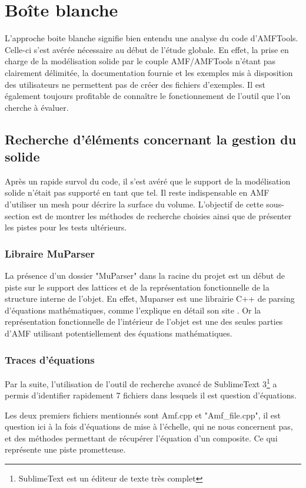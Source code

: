 \documentclass{tnreport}
\begin{document}
\section{Boîte blanche}
L'approche boite blanche signifie bien entendu une analyse du code d'AMFTools. Celle-ci s'est avérée nécessaire au début de l'étude globale. En effet, la prise en charge de la modélisation solide par le couple AMF/AMFTools n'étant pas clairement délimitée, la documentation fournie et les exemples mis à disposition des utilisateurs ne permettent pas de créer des fichiers d'exemples. Il est également toujours profitable de connaître le fonctionnement de l'outil que l'on cherche à évaluer.  
\subsection{Recherche d'éléments concernant la gestion du solide}
\label{subsec:elementsolides}
Après un rapide survol du code, il s'est avéré que le support de la modélisation solide n'était pas supporté en tant que tel. Il reste indispensable en AMF d'utiliser un mesh pour décrire la surface du volume. L'objectif de cette sous-section est de montrer les méthodes de recherche choisies ainsi que de présenter les pistes pour les tests ultérieurs. 
\subsubsection{Libraire MuParser}

La présence d'un dossier "MuParser" dans la racine du projet est un début de piste sur le support des lattices et de la représentation fonctionnelle de la structure interne de l'objet. En effet, Muparser est une librairie C++ de parsing d'équations mathématiques, comme l'explique en détail son site \cite{muparsersite}. Or la représentation fonctionnelle de l'intérieur de l'objet est une des seules parties d'AMF utilisant potentiellement des équations mathématiques. 

\subsubsection{Traces d'équations}\label{subsec:tracequa}
Par la suite, l'utilisation de l'outil de recherche avancé de SublimeText 3\footnote{SublimeText est un éditeur de texte très complet} a permis d'identifier rapidement 7 fichiers dans lesquels il est question d'équations.

Les deux premiers fichiers mentionnés sont Amf.cpp et "Amf\_file.cpp", il est question ici à la fois d'équations de mise à l'échelle, qui ne nous concernent pas, et des méthodes permettant de récupérer l'équation d'un composite. Ce qui représente une piste prometteuse.
\end{document}
